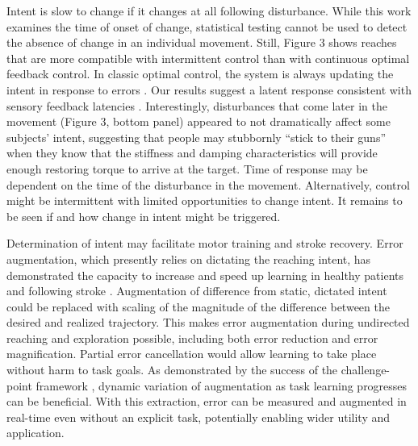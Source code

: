 \documentclass[10pt]{article}
\begin{document}
Intent is slow to change if it changes at all following disturbance. While this work examines the time of onset of change, statistical testing cannot be used to detect the absence of change in an individual movement. Still, Figure 3 shows reaches that are more compatible with intermittent control than with continuous optimal feedback control. In classic optimal control, the system is always updating the intent in response to errors \cite{todorov2002optimal}. Our results suggest a latent response consistent with sensory feedback latencies \cite{pruszynski2012optimal}. Interestingly, disturbances that come later in the movement (Figure 3, bottom panel) appeared to not dramatically affect some subjects' intent, suggesting that people may stubbornly ``stick to their guns'' when they know that the stiffness and damping characteristics will provide enough restoring torque to arrive at the target. Time of response may be dependent on the time of the disturbance in the movement. Alternatively, control might be intermittent \cite{gawthrop2011intermittent} with limited opportunities to change intent. It remains to be seen if and how change in intent might be triggered. 

Determination of intent may facilitate motor training and stroke recovery. Error augmentation, which presently relies on dictating the reaching intent, has demonstrated the capacity to increase and speed up learning in healthy patients \cite{patton2004robot} and following stroke \cite{patton2006evaluation}. Augmentation of difference from static, dictated intent could be replaced with scaling of the magnitude of the difference between the desired and realized trajectory. This makes error augmentation during undirected reaching and exploration possible, including both error reduction and error magnification. Partial error cancellation would allow learning to take place without harm to task goals. As demonstrated by the success of the challenge-point framework \cite{guadagnoli2004challenge}, dynamic variation of augmentation as task learning progresses can be beneficial. With this extraction, error can be measured and augmented in real-time even without an explicit task, potentially enabling wider utility and application. 
\end{document}
